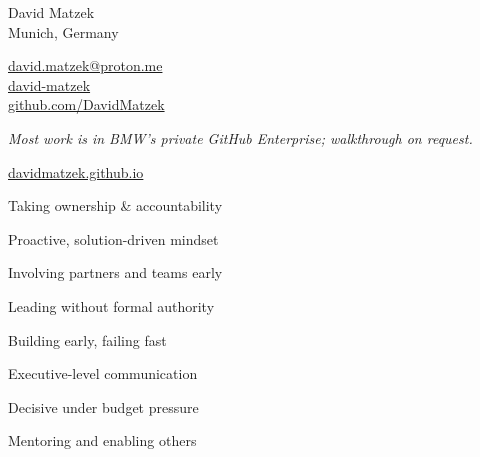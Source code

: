 



\noindent
\begin{minipage}[t]{\sidebarw}\vspace{0pt}
  \begin{center}{\color{accent}\fontsize{18}{20}\selectfont David Matzek}\\[1mm]
  {\footnotesize\color{subgray}Munich, Germany}\end{center}

  {\footnotesize
  \faEnvelope\hspace{1.6mm}\href{mailto:david.matzek@proton.me}{david.matzek@proton.me}\\[1mm]
  \faLinkedin\hspace{1.6mm}\href{https://www.linkedin.com/in/david-matzek-04114a10a}{david-matzek}\\[1mm]
  \faGithub\hspace{1.9mm}\href{https://github.com/DavidMatzek}{github.com/DavidMatzek}\\[0.4mm]
  {\scriptsize\color{subgray}\RaggedRight\textit{Most work is in BMW's private GitHub Enterprise; walkthrough on request.}\par}\vspace{1mm}
  \faGlobe\hspace{1.6mm}\href{https://davidmatzek.github.io/DavidMatzek/}{davidmatzek.github.io}\par}


  \begin{cvitems}
    \item Taking ownership \& accountability
    \item Proactive, solution-driven mindset
    \item Involving partners and teams early
    \item Leading without formal authority
    \item Building early, failing fast
    \item Executive-level communication
    \item Decisive under budget pressure
    \item Mentoring and enabling others
  \end{cvitems}
\end{minipage}%
